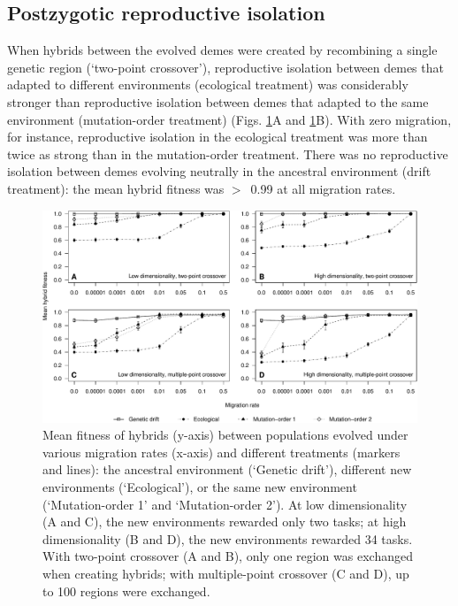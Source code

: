 \begin{doublespace}
\subsection{Postzygotic reproductive isolation}

When hybrids between the evolved demes
were created by recombining a single genetic region (`two-point crossover'),
reproductive isolation between demes
that adapted to different environments (ecological treatment)
was considerably stronger than
reproductive isolation between demes
that adapted to the same environment (mutation-order treatment)
(Figs. \ref{hybrid_fitness}A and \ref{hybrid_fitness}B).
%
With zero migration, for instance,
reproductive isolation in the ecological treatment
was more than twice as strong than in the mutation-order treatment.
%
There was no reproductive isolation between demes
evolving neutrally in the ancestral environment (drift treatment):
the mean hybrid fitness was $>$~0.99 at all migration rates.



\begin{figure}
\centering
\includegraphics[width=0.95\linewidth]{hybrid_fitness.pdf}
\caption{Mean fitness of hybrids (y-axis)
  between populations evolved under various migration rates (x-axis)
  and different treatments (markers and lines):
  the ancestral environment (`Genetic drift'),
  different new environments (`Ecological'),
  or the same new environment (`Mutation-order 1' and `Mutation-order 2').
  At low dimensionality (A and C),
  the new environments rewarded only two tasks;
  at high dimensionality (B and D),
  the new environments rewarded 34 tasks.
  With two-point crossover (A and B),
  only one region was exchanged when creating hybrids;
  with multiple-point crossover (C and D),
  up to 100 regions were exchanged.}
\label{hybrid_fitness}
\end{figure}




\end{doublespace}
